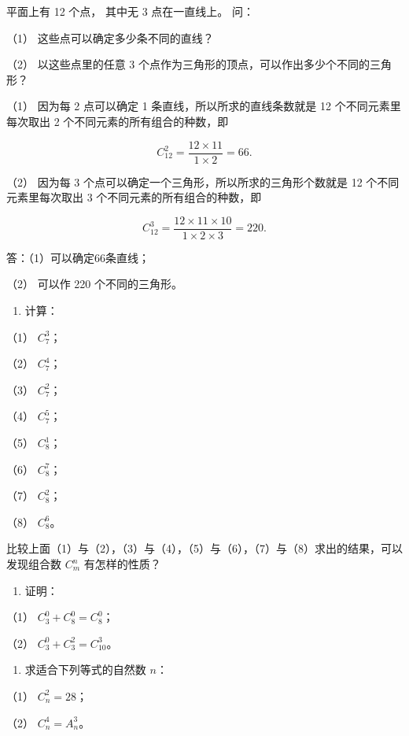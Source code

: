 平面上有 12 个点， 其中无 3 点在一直线上。 问：

（1） 这些点可以确定多少条不同的直线？

（2） 以这些点里的任意 3
个点作为三角形的顶点，可以作出多少个不同的三角形？


（1） 因为每 2 点可以确定 1 条直线，所以所求的直线条数就是 12
个不同元素里每次取出 2 个不同元素的所有组合的种数，即

\[
C _ {12} ^ {2} = \frac {12 \times 11}{1 \times 2} = 66.
\]

（2） 因为每 3 个点可以确定一个三角形，所以所求的三角形个数就是 12
个不同元素里每次取出 3 个不同元素的所有组合的种数，即

\[
C _ {12} ^ {3} = \frac {12 \times 11 \times 10}{1 \times 2 \times 3} = 220.
\]

答：（1）可以确定66条直线；

（2） 可以作 220 个不同的三角形。

\begin{enumerate}
\item
  计算：
\end{enumerate}

（1） \(C_7^3\)；

（2） \(C_{7}^{4}\)；

（3） \(C_{7}^{2}\)；

（4） \(C_7^5\)；

（5） \(C_{8}^{1}\)；

（6） \(C_8^7\)；

（7） \(C_{8}^{2}\)；

（8） \(C_8^6\)。

比较上面（1）与（2），（3）与（4），（5）与（6），（7）与（8）求出的结果，可以发现组合数
\(C_{m}^{n}\) 有怎样的性质？

\begin{enumerate}[start=2]
\item
  证明：
\end{enumerate}

（1） \(C_3^0 + C_8^0 = C_8^0\)；

（2） \(C_3^0 + C_3^2 = C_{10}^3\)。

\begin{enumerate}[start=3]
\item
  求适合下列等式的自然数 \(n\)：
\end{enumerate}

（1） \(C_n^2=28\)；

（2） \(C_{n}^{4} = A_{n}^{3}\)。


